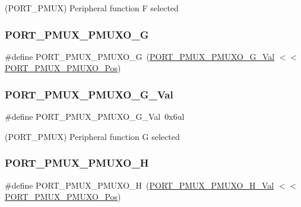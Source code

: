 (P\+O\+R\+T\+\_\+\+P\+M\+UX) Peripheral function F selected 

\mbox{\label{group___s_a_m_d21___p_o_r_t_ga2d37482b7664ee109ca8938c2cfe7188}} 
\subsubsection{\texorpdfstring{PORT\_PMUX\_PMUXO\_G}{PORT\_PMUX\_PMUXO\_G}}
{\footnotesize\ttfamily \#define P\+O\+R\+T\+\_\+\+P\+M\+U\+X\+\_\+\+P\+M\+U\+X\+O\+\_\+G~(\mbox{\hyperlink{group___s_a_m_d21___p_o_r_t_ga88f1c9d7168ccf18b04ec62d78f05698}{P\+O\+R\+T\+\_\+\+P\+M\+U\+X\+\_\+\+P\+M\+U\+X\+O\+\_\+\+G\+\_\+\+Val}}         $<$$<$ \mbox{\hyperlink{group___s_a_m_d21___p_o_r_t_ga80a28619ad2db553b64d4ce4545368d3}{P\+O\+R\+T\+\_\+\+P\+M\+U\+X\+\_\+\+P\+M\+U\+X\+O\+\_\+\+Pos}})}

\mbox{\label{group___s_a_m_d21___p_o_r_t_ga88f1c9d7168ccf18b04ec62d78f05698}} 
\subsubsection{\texorpdfstring{PORT\_PMUX\_PMUXO\_G\_Val}{PORT\_PMUX\_PMUXO\_G\_Val}}
{\footnotesize\ttfamily \#define P\+O\+R\+T\+\_\+\+P\+M\+U\+X\+\_\+\+P\+M\+U\+X\+O\+\_\+\+G\+\_\+\+Val~0x6ul}



(P\+O\+R\+T\+\_\+\+P\+M\+UX) Peripheral function G selected 

\mbox{\label{group___s_a_m_d21___p_o_r_t_ga5f57408b76430659c5cd863bd3cdaf23}} 
\subsubsection{\texorpdfstring{PORT\_PMUX\_PMUXO\_H}{PORT\_PMUX\_PMUXO\_H}}
{\footnotesize\ttfamily \#define P\+O\+R\+T\+\_\+\+P\+M\+U\+X\+\_\+\+P\+M\+U\+X\+O\+\_\+H~(\mbox{\hyperlink{group___s_a_m_d21___p_o_r_t_ga3809d955d07edd57731098d963d4856a}{P\+O\+R\+T\+\_\+\+P\+M\+U\+X\+\_\+\+P\+M\+U\+X\+O\+\_\+\+H\+\_\+\+Val}}         $<$$<$ \mbox{\hyperlink{group___s_a_m_d21___p_o_r_t_ga80a28619ad2db553b64d4ce4545368d3}{P\+O\+R\+T\+\_\+\+P\+M\+U\+X\+\_\+\+P\+M\+U\+X\+O\+\_\+\+Pos}})}

